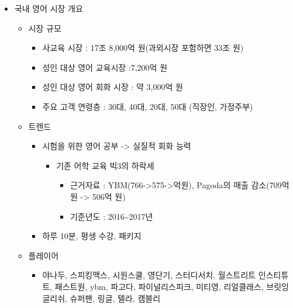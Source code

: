 \documentclass[11pt]{article}
\providecommand{\tightlist}{%
      \setlength{\itemsep}{0pt}\setlength{\parskip}{0pt}}
\begin{document}
\begin{itemize}
\tightlist
\item
  국내 영어 시장 개요

  \begin{itemize}
  \tightlist
  \item
    시장 규모

    \begin{itemize}
    \tightlist
    \item
      사교육 시장 : 17조 8,000억 원(과외시장 포함하면 33조 원)
    \item
      성인 대상 영어 교육시장 :7,200억 원
    \item
      성인 대상 영어 회화 시장 : 약 3,000억 원
    \item
      주요 고객 연령층 : 30대, 40대, 20대, 50대 (직장인, 가정주부)
    \end{itemize}
  \item
    트렌드

    \begin{itemize}
    \tightlist
    \item
      시험을 위한 영어 공부 -\textgreater{} 실질적 회화 능력

      \begin{itemize}
      \tightlist
      \item
        기존 어학 교육 빅3의 하락세

        \begin{itemize}
        \tightlist
        \item
          근거자료 : YBM(766-\textgreater{}575-\textgreater{}억원),
          Pagoda의 매출 감소(709억 원 -\textgreater{} 506억 원)
        \item
          기준년도 : 2016\textasciitilde{}2017년
        \end{itemize}
      \end{itemize}
    \item
      하루 10분, 평생 수강, 패키지
    \end{itemize}
  \item
    플레이어

    \begin{itemize}
    \tightlist
    \item
      야나두, 스피킹맥스, 시원스쿨, 영단기, 스터디서치, 월스트리트
      인스티튜트, 패스트원, ybm, 파고다, 파이널리스피크, 미티영,
      리얼클래스, 브릿잉글리쉬, 슈퍼팬, 링글, 텔라, 캠블리
    \end{itemize}
  \end{itemize}
\end{itemize}
\end{document}
